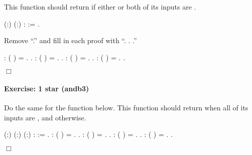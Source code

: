 \documentclass[12pt]{report}
\begin{document}
 This function should return  if either or both of
    its inputs are . \begin{coqdoccode}
\coqdocemptyline
\coqdocnoindent
{}  (:) (:) :  :=\coqdoceol
\coqdocindent{1.00em}
 .\coqdoceol
\coqdocemptyline
\end{coqdoccode}
Remove ``.'' and fill in each proof with 
    ``. . .'' \begin{coqdoccode}
\coqdocemptyline
\coqdocnoindent
{} :               (  ) = .\coqdoceol
 .\coqdoceol
\coqdocnoindent
{} :               (  ) = .\coqdoceol
 .\coqdoceol
\coqdocnoindent
{} :               (  ) = .\coqdoceol
 .\coqdoceol
\coqdocnoindent
{} :               (  ) = .\coqdoceol
 .\coqdoceol
\end{coqdoccode}
\ensuremath{\Box} 

\paragraph{Exercise: 1 star (andb3)}

 Do the same for the  function below. This function should
    return  when all of its inputs are , and 
    otherwise. \begin{coqdoccode}
\coqdocemptyline
\coqdocnoindent
{}  (:) (:) (:) :  :=\coqdoceol
\coqdocindent{1.00em}
 .\coqdoceol
\coqdocemptyline
\coqdocnoindent
{} :                 (   ) = .\coqdoceol
 .\coqdoceol
\coqdocnoindent
{} :                 (   ) = .\coqdoceol
 .\coqdoceol
\coqdocnoindent
{} :                 (   ) = .\coqdoceol
 .\coqdoceol
\coqdocnoindent
{} :                 (   ) = .\coqdoceol
 .\coqdoceol
\end{coqdoccode}
\ensuremath{\Box} \begin{coqdoccode}
\coqdocemptyline
\end{coqdoccode}
\end{document}
